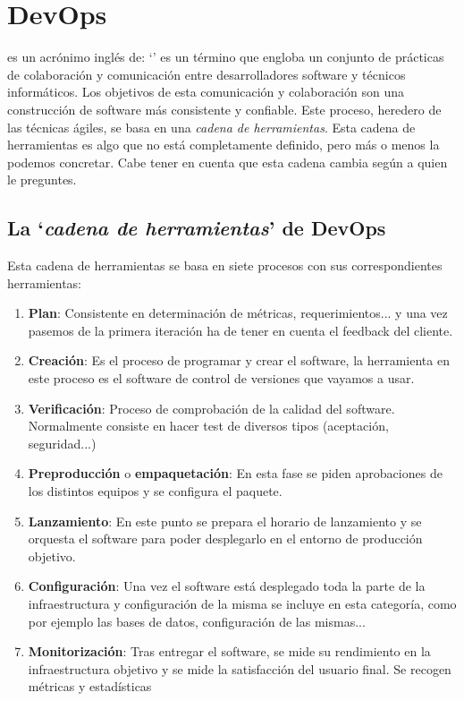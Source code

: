 \section{DevOps}

 es un acrónimo inglés de: `' es un término que engloba un conjunto de prácticas de colaboración y comunicación entre desarrolladores software y técnicos informáticos. Los objetivos de esta comunicación y colaboración son una construcción de software más consistente y confiable. Este proceso, heredero de las técnicas ágiles, se basa en una \textit{cadena de herramientas}. Esta cadena de herramientas es algo que no está completamente definido, pero más o menos la podemos concretar. Cabe tener en cuenta que esta cadena cambia según a quien le preguntes.

\subsection{La `\emph{cadena de herramientas}' de DevOps}

Esta cadena de herramientas se basa en siete procesos con sus correspondientes herramientas:

\begin{enumerate}
 \item \textbf{Plan}: Consistente en determinación de métricas, requerimientos... y una vez pasemos de la primera iteración ha de tener en cuenta el feedback del cliente.
 \item \textbf{Creación}: Es el proceso de programar y crear el software, la herramienta en este proceso es el software de control de versiones que vayamos a usar.
 \item \textbf{Verificación}: Proceso de comprobación de la calidad del software. Normalmente consiste en hacer test de diversos tipos (aceptación, seguridad...)
 \item \textbf{Preproducción} o \textbf{empaquetación}: En esta fase se piden aprobaciones de los distintos equipos y se configura el paquete.
 \item \textbf{Lanzamiento}: En este punto se prepara el horario de lanzamiento y se orquesta el software para poder desplegarlo en el entorno de producción objetivo.
 \item \textbf{Configuración}: Una vez el software está desplegado toda la parte de la infraestructura y configuración de la misma se incluye en esta categoría, como por ejemplo las bases de datos, configuración de las mismas...
 \item \textbf{Monitorización}: Tras entregar el software, se mide su rendimiento en la infraestructura objetivo y se mide la satisfacción del usuario final. Se recogen métricas y estadísticas
\end{enumerate}


